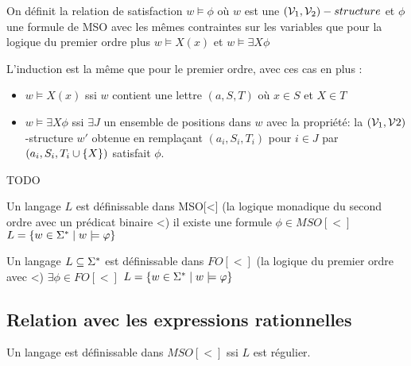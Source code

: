 \begin{definition}
	On définit la relation de satisfaction $w \models \phi$ où $w$ est une $(\mathcal{V}_1, \mathcal{V}_2)-structure$ et $\phi$ une formule de
	MSO avec les mêmes contraintes sur les variables que pour la logique du premier ordre %
	plus $w \models X(x)$ et $w \models \exists X \phi$
\end{definition}

L'induction est la même que pour le premier ordre, avec ces cas en plus :
\begin{itemize}
	\item $w \models X (x)$ ssi $w$ contient une lettre $(a,S,T)$ où $x \in S$ et $X \in T$
	\item $w \models \exists X \phi$ ssi $\exists J$ un ensemble de positions dans $w$ avec la propriété:
	      la $(\mathcal{V}_1, \mathcal{V}2)$-structure $w'$ obtenue en remplaçant $(a_i, S_i,T_i)$ pour $i \in J$ par $(a_i, S_i, T_i \cup \left\{X\right\})$ satisfait $\phi$.
\end{itemize}


\begin{exemple}
	TODO
\end{exemple}


\begin{definition}
	Un langage $L$ est définissable dans MSO[<] (la logique monadique du second ordre avec un prédicat binaire <)
	\ssi il existe une formule $\phi \in MSO[<]$ \tlq $L = \left\{w\in \Sigma^{*} \mid w \models \varphi\right\}$
\end{definition}

\begin{definition}
	Un langage $L \subseteq \Sigma^{*}$ est définissable dans $FO[<]$ (la logique du premier ordre avec <)
	\ssi $\exists \phi \in FO[<]$ \tlq $L = \left\{w \in \Sigma^{*} \mid w \models \varphi\right\}$
\end{definition}


\subsection{Relation avec les expressions rationnelles}

\begin{theorem}
	Un langage est définissable dans $MSO[<]$ ssi $L$ est régulier.
\end{theorem}



